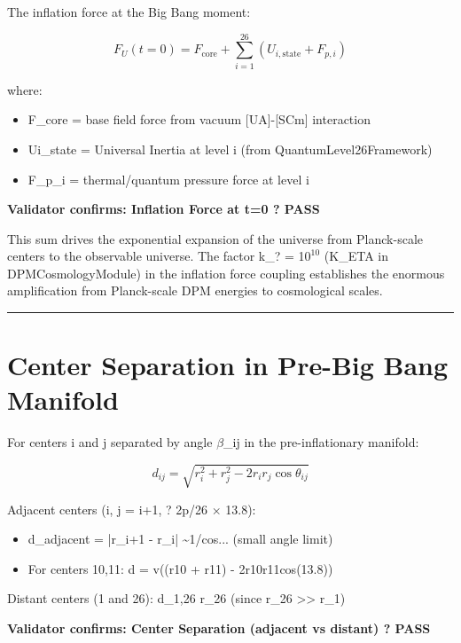 \documentclass[12pt,a4paper]{article}
\begin{document}
The inflation force at the Big Bang moment:

\begin{equation}
F_U(t=0) = F_{\mathrm{core}} + \sum_{i=1}^{26} (U_{i,\mathrm{state}} + F_{p,i})
\end{equation}

where:

\begin{itemize}
  \item F\_core = base field force from vacuum [UA]-[SCm] interaction
  \item Ui\_state = Universal Inertia at level i (from QuantumLevel26Framework)
  \item F\_{p\_i} = thermal/quantum pressure force at level i
\end{itemize}

\textbf{Validator confirms: Inflation Force at t=0 ? PASS}

This sum drives the exponential expansion of the universe from Planck-scale centers to the observable universe. The factor k\_? = 1$0^{10}$ (K\_ETA in DPMCosmologyModule) in the inflation force coupling establishes the enormous amplification from Planck-scale DPM energies to cosmological scales.

\medskip\hrule\medskip

\section{Center Separation in Pre-Big Bang Manifold}

For centers i and j separated by angle $\beta$\_ij in the pre-inflationary manifold:

\begin{equation}
d_{ij} = \sqrt{r_i^2 + r_j^2 - 2r_i r_j \cos\theta_{ij}}
\end{equation}

Adjacent centers (i, j = i+1, ?  2p/26 $\times$ 13.8):

\begin{itemize}
  \item d\_adjacent = |r\_{i+1} - r\_i|  \textasciitilde{}1/cos... (small angle limit)
  \item For centers 10,11: d = v((r10 + r11) - 2r10r11cos(13.8))
\end{itemize}

Distant centers (1 and 26): d\_1,26  r\_26 (since r\_26 >> r\_1)

\textbf{Validator confirms: Center Separation (adjacent vs distant) ? PASS}
\end{document}
